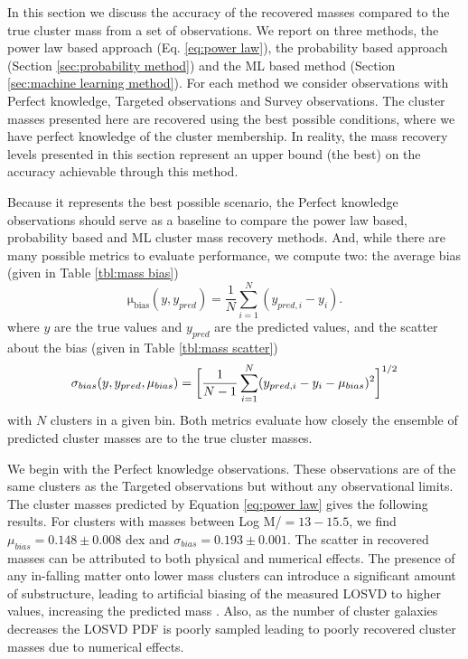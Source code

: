 In this section we discuss the accuracy of the recovered masses compared to the true cluster mass from a set of observations. We report on three methods, the power law based approach (Eq. \ref{eq:power law}), the probability based approach (Section \ref{sec:probability method}) and the ML based method (Section \ref{sec:machine learning method}). For each method we consider observations with Perfect knowledge, Targeted observations and Survey observations. The cluster masses presented here are recovered using the best possible conditions, where we have perfect knowledge of the cluster membership. In reality, the mass recovery levels presented in this section represent an upper bound (the best) on the accuracy achievable through this method.

Because it represents the best possible scenario, the Perfect knowledge observations should serve as a baseline to compare the power law based, probability based and ML cluster mass recovery methods. And, while there are many possible metrics to evaluate performance, we compute two: the average bias (given in Table \ref{tbl:mass bias})
\begin{equation}\label{eqn: bias}
\mathrm{\mu_{bias}}(y,y_{pred}) = \frac{1}{N} \sum_{i=1}^N (y_{pred,i} - y_i).
\end{equation}
where $y$ are the true values and $y_{pred}$ are the predicted values, and the scatter about the bias (given in Table \ref{tbl:mass scatter})
\begin{equation}\label{eqn: scatter}
	\sigma_{bias}(y,y_{pred}, \mu_{bias}) = \bigg{[}\frac{1}{N-1} \sum_{i=1}^N (y_{pred,i} - y_i - \mu_{bias})^2 \bigg{]}^{1/2}
\end{equation}
with $N$ clusters in a given bin. Both metrics evaluate how closely the ensemble of predicted cluster masses are to the true cluster masses.

We begin with the Perfect knowledge observations. These observations are of the same clusters as the Targeted observations but without any observational limits. The cluster masses predicted by Equation \ref{eq:power law} gives the following results. For clusters with masses between Log M/\Msol $= 13 - 15.5$, we find $\mu_{bias} = 0.148\pm{0.008}$ dex and $\sigma_{bias} = 0.193\pm{0.001}$. The scatter in recovered masses can be attributed to both physical and numerical effects. The presence of any in-falling matter onto lower mass clusters can introduce a significant amount of substructure, leading to artificial biasing of the measured LOSVD to higher values, increasing the predicted mass . Also, as the number of cluster galaxies decreases the LOSVD PDF is poorly sampled leading to poorly recovered cluster masses due to numerical effects. 


